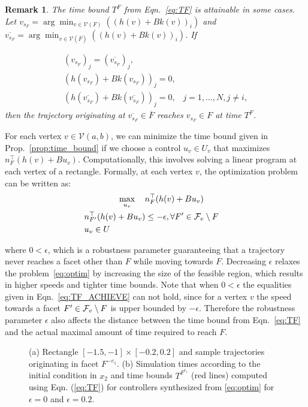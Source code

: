 \documentclass{ifacconf}
\newtheorem{remark}{Remark}
\newcommand{\VNset}{\mathcal{V}(a,b)}
\begin{document}
\begin{remark} The time bound $T^F$ from Eqn.~\eqref{eq:TF} is attainable in some cases. Let $v_{s_F} =  \arg\min_{v \in \mathcal{V}(F)}{((h(v) + Bk(v))_i)}$ and $\overline{v_{s_F}}  = \arg\min_{v \in \mathcal{V}(\overline{F})}{((h(v) + Bk(v))_i)}$. If 


\begin{equation}\label{eq:TF_ACHIEVE}
\begin{array}{l}
(v_{s_F})_j = (\overline{v_{{s_F}}})_j, \\
(h(v_{s_F}) + Bk(v_{s_F}))_j = 0, \\
(h(\overline{v_{s_F}}) + Bk(\overline{v_{s_F}}))_j=0, \hspace{10pt} j=1,\ldots,N, j \neq i,
\end{array}
\end{equation}
then the trajectory originating at  $\overline{v_{s_F}} \in \overline{F}$ reaches $v_{s_F} \in F$ at time $T^F$.
\end{remark}


For each vertex $v \in \VNset$, we can minimize the time bound 
given in Prop.~\ref{prop:time_bound} if we choose a control $u_v \in U_v$ that maximizes $n_F^\top(h(v) + Bu_v)$. Computationally, this involves 
solving a linear program at each vertex of a rectangle. Formally, at each vertex $v$, the optimization problem can be written as: 
\begin{align}
	& \ \ \ \ \ \ \ \ \ \ \ \ \max_{u_v}\ \ \  n_F^\top(h(v) + Bu_v) & \nonumber \label{eq:optim}\\
	&    n_{F'}^\top(h(v) + Bu_v) \leq -\epsilon ,  \forall  F' \in {\cal F}_v \setminus F \nonumber \\
	& u_v \in U
\end{align}

where $0 < \epsilon$, which is a robustness parameter guaranteeing  that a trajectory never reaches a facet other than $F$ while moving towards $F$. Decreasing $\epsilon$ relaxes the problem~\eqref{eq:optim} by increasing the size of the feasible region, which results in higher speeds and tighter time bounds.
Note that when $0 < \epsilon$ the equalities given in Eqn.~\eqref{eq:TF_ACHIEVE}  can not hold, 
since for a vertex $v$ the speed towards a facet $F' \in {\cal F}_v \setminus F$ is upper bounded by $-\epsilon$. 
Therefore the robustness parameter $\epsilon$ also affects the distance between the time bound from Eqn.~\eqref{eq:TF} and the actual maximal amount of time required to reach $F$. 
\begin{figure}
\centering
{}
\caption{(a) Rectangle $[-1.5, -1] \times [-0.2, 0.2]$ and sample trajectories originating in facet $F^{-e_1}$. 
(b) Simulation times according to the initial condition in $x_2$ and time bounds $T^{F^{e_1}}$ (red lines) computed using
Eqn. (\ref{eq:TF}) for controllers synthesized from \eqref{eq:optim} for $\epsilon=0$ and $\epsilon=0.2$.}
\label{fig:ex_r}
\end{figure} 
\end{document}
